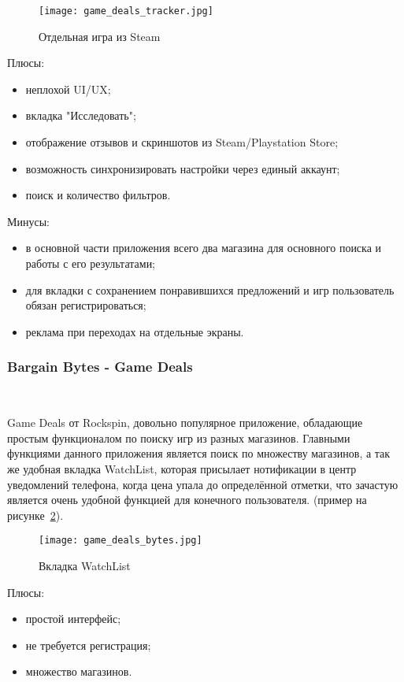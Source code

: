 \begin{figure}[H]
 \centering
   \texttt{[image: game\_deals\_tracker.jpg]} 
   \caption{Отдельная игра из Steam}
   \label{fig:domain:game_deals_tracker}
\end{figure}
 
Плюсы:
\begin{itemize}
 \item неплохой UI/UX;
 \item вкладка "Исследовать";
 \item отображение отзывов и скриншотов из Steam/Playstation Store;
 \item возможность синхронизировать настройки через единый аккаунт;
 \item поиск и количество фильтров.
\end{itemize}
 
Минусы:
\begin{itemize}
 \item в основной части приложения всего два магазина для основного поиска и работы с его результатами;
 \item для вкладки с сохранением понравившихся предложений и игр пользователь обязан регистрироваться;
 \item реклама при переходах на отдельные экраны.
\end{itemize}
 
\subsubsection{Bargain Bytes - Game Deals}~\par
Game Deals от Rockspin, довольно популярное приложение, обладающие простым функционалом по поиску игр из разных магазинов. Главными функциями данного приложения является поиск по множеству магазинов, а так же удобная вкладка WatchList, которая присылает нотификации в центр уведомлений телефона, когда цена упала до определённой отметки, что зачастую является очень удобной функцией для конечного пользователя. (пример на рисунке~\ref{fig:domain:game_deals_bytes}).
 
\begin{figure}[H]
 \centering
   \texttt{[image: game\_deals\_bytes.jpg]} 
   \caption{Вкладка WatchList}
   \label{fig:domain:game_deals_bytes}
\end{figure}
 
Плюсы:
\begin{itemize}
 \item простой интерфейс;
 \item не требуется регистрация;
 \item множество магазинов.
\end{itemize}
 
